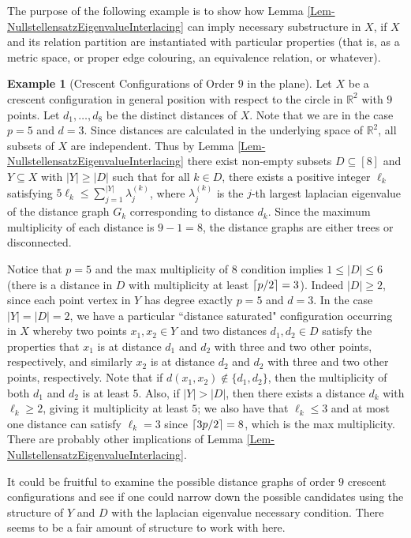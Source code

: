 \documentclass[12pt]{article}
\newcommand{\R}{\mathbb{R}}
\DeclarePairedDelimiter\ceil{\lceil}{\rceil}
\theoremstyle{definition}
\newtheorem{eg}{Example}
\begin{document}
	The purpose of the following example is to show how Lemma \ref{Lem-NullstellensatzEigenvalueInterlacing} can imply necessary substructure in $X$, if $X$ and its relation partition are instantiated with particular properties (that is, as a metric space, or proper edge colouring, an equivalence relation, or whatever).
	
	\begin{eg}[Crescent Configurations of Order $9$ in the plane]\label{Example-CrescentsOrder9}
		Let $X$ be a crescent configuration in general position with respect to the circle in $\R^2$ with $9$ points.  Let $d_1,\ldots, d_8$ be the distinct distances of $X$.  Note that we are in the case $p = 5$ and $d = 3$.  Since distances are calculated in the underlying space of $\R^2$, all subsets of $X$ are independent.  Thus by Lemma \ref{Lem-NullstellensatzEigenvalueInterlacing} there exist non-empty subsets $D \subseteq [8]$ and $Y \subseteq X$ with $|Y| \geq |D|$ such that for all $k \in D$, there exists a positive integer $\ell_k$ satisfying $5\ell_k \leq \sum_{j=1}^{|Y|}\lambda_j^{(k)}$, where $\lambda_j^{(k)}$ is the $j$-th largest laplacian eigenvalue of the distance graph $G_k$ corresponding to distance $d_k$.  Since the maximum multiplicity of each distance is $9-1 = 8$, the distance graphs are either trees or disconnected.
		
		Notice that $p = 5$ and the max multiplicity of $8$ condition implies $1 \leq |D| \leq 6$ (there is a distance in $D$ with multiplicity at least $\ceil{p/2} = 3$).  Indeed $|D| \geq 2$, since each point vertex in $Y$ has degree exactly $p = 5$ and $d = 3$.  In the case $|Y| = |D| = 2$, we have a particular ``distance saturated" configuration occurring in $X$ whereby two points $x_1,x_2 \in Y$ and two distances $d_1,d_2 \in D$ satisfy the properties that $x_1$ is at distance $d_1$ and $d_2$ with three and two other points, respectively, and similarly $x_2$ is at distance $d_2$ and $d_2$ with three and two other points, respectively.  Note that if $d(x_1,x_2) \notin \{d_1,d_2\}$, then the multiplicity of both $d_1$ and $d_2$ is at least $5$.  Also, if $|Y| > |D|$, then there exists a distance $d_k$ with $\ell_k \geq 2$, giving it multiplicity at least $5$; we also have that $\ell_k \leq 3$ and at most one distance can satisfy $\ell_k = 3$ since $\ceil{3p/2} = 8$, which is the max multiplicity.  There are probably other implications of Lemma \ref{Lem-NullstellensatzEigenvalueInterlacing}.
		
		It could be fruitful to examine the possible distance graphs of order $9$ crescent configurations and see if one could narrow down the possible candidates using the structure of $Y$ and $D$ with the laplacian eigenvalue necessary condition.  There seems to be a fair amount of structure to work with here.
	\end{eg}
	
\end{document}
